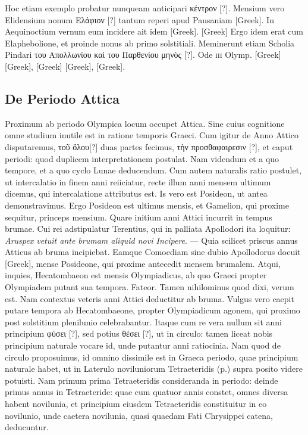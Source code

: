 Hoc etiam exemplo probatur nunqueam anticipari
\textgreek{κέντρον [?]}.
Mensium vero Elidensium nonum \textgreek{Ελάφιον [?]} tantum reperi apud
Pausaniam \textgreek{[Greek]}.
In Aequinoctium
vernum eum incidere ait idem \textgreek{[Greek]}.
\textgreek{[Greek]}
Ergo idem erat cum Elaphebolione, et
proinde nonus ab primo solstitiali.
Meminerunt etiam Scholia Pindari
\textgreek{του Απολλωνίου καὶ του Παρθενίου μηνὸς [?]}.
Ode \textsc{iii} Olymp.
\textgreek{[Greek]}
\textgreek{[Greek]}, \textgreek{[Greek]}
\textgreek{[Greek]}, \textgreek{[Greek]}.

\subsection{De Periodo Attica}

Proximum ab periodo Olympica locum occupet Attica.
Sine
cuius cognitione omne studium inutile est in ratione temporis
Graeci.
Cum igitur de Anno Attico disputaremus, \textgreek{τοῦ ὄλου[?]} duas
partes fecimus, \textgreek{τὴν προσθαφαιρεσιν [?]}, et caput periodi:
 quod duplicem
interpretationem postulat.
Nam videndum et a quo tempore, et a quo
cyclo Lunae deducendum.
Cum autem naturalis ratio postulet, ut intercalatio
in finem anni reiiciatur, recte illum anni mensem ultimum
dicemus, qui intercalatione attributus est.
Is vero est Posideon, ut antea
demonstravimus.
Ergo Posideon est ultimus mensis, et Gamelion,
qui proxime sequitur, princeps mensium.
Quare initium
anni Attici incurrit in tempus brumae.
Cui rei adstipulatur Terentius,
qui in palliata Apollodori ita loquitur: \emph{Aruspex vetuit ante brumam
aliquid novi Incipere}.
--- Quia scilicet priscus annus Atticus
ab bruma incipiebat.
Eamque Comoediam sine dubio Apollodorus
docuit \textgreek{[Greek]}, mense Posideone, qui proxime antecedit
mensem brumalem.
Atqui, inquies, Hecatombaeon est mensis
Olympiadicus, ab quo Graeci propter Olympiadem putant sua
tempora.
Fateor.
Tamen nihilominus quod dixi, verum est.
Nam
contextus veteris anni Attici deductitur ab bruma.
Vulgus vero caepit
putare tempora ab Hecatombaeone, propter Olympiadicum agonem,
qui proximo post solstitium plenilunio celebrabantur.
Itaque cum re
vera nullum sit anni principium \textgreek{φύσει [?]},
 sed potius \textgreek{θέσει [?]}, ut in circulo:
tamen liceat nobis principium naturale vocare id, unde putantur anni
ratiocinia.
Nam quod de circulo proposuimus, id omnino dissimile
est in Graeca periodo, quae principium naturale habet, ut in Laterulo
noviluniorum Tetraeteridis (p.\pageref{tab:novilunia})
 supra posito videre potuisti.
Nam primum
prima Tetraeteridis consideranda in periodo: deinde primus annus
in Tetraeteride: quae cum quatuor annis constet, omnes diversa
habent novilunia, et principium eiusdem Tetraeteridis constituitur
in eo novilunio, unde caetera novilunia, quasi quaedam Fati Chrysippei
catena, deducuntur.

